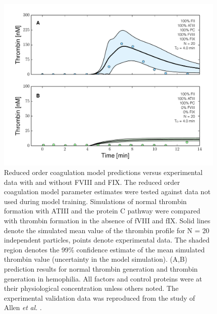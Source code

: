 \documentclass[12pt]{article}
\begin{document}
\begin{figure}
\centering
\includegraphics[width=1.0\textwidth]{./figs/Figure-6-Hemophilia.pdf}
\caption{Reduced order coagulation model predictions versus experimental data with and without FVIII and FIX.
The reduced order coagulation model parameter estimates were tested against data not used during model training. 
Simulations of normal thrombin formation with ATIII and the protein C pathway were compared with thrombin formation in the absence of fVIII and fIX.
Solid lines denote the simulated mean value of the thrombin profile for N = 20 independent particles, points denote experimental data.
The shaded region denotes the 99\% confidence estimate of the mean simulated thrombin value (uncertainty in the model simulation). 
(A,B) prediction results for normal thrombin generation and thrombin generation in hemophilia. 
All factors and control proteins were at their physiological concentration unless others noted.
The experimental validation data was reproduced from the study of Allen \textit{et al.} \citep{ALLEN2006}.}\label{fig-hemophilia}
\end{figure}

\clearpage
\end{document}
